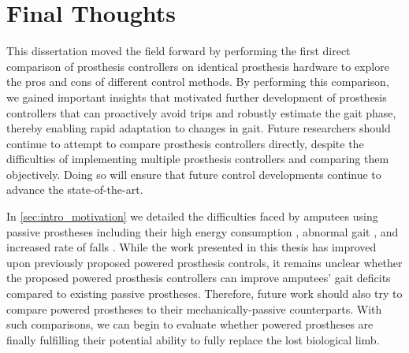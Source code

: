 \section{Final Thoughts}

This dissertation moved the field forward by performing the first direct
comparison of prosthesis controllers on identical prosthesis hardware to explore
the pros and cons of different control methods. By performing this comparison,
we gained important insights that motivated further development of prosthesis
controllers that can proactively avoid trips and robustly estimate the gait
phase, thereby enabling rapid adaptation to changes in gait. Future researchers
should continue to attempt to compare prosthesis controllers directly, despite
the difficulties of implementing multiple prosthesis controllers and comparing
them objectively. Doing so will ensure that future control developments
continue to advance the state-of-the-art. 

In \cref{sec:intro_motivation} we detailed the difficulties faced by amputees
using passive prostheses including their high energy consumption
\citep{waters1976energy}, abnormal gait \citep{jaegers1995prosthetic}, and
increased rate of falls \citep{miller2001prevalence}. While the work presented
in this thesis has improved upon previously proposed powered prosthesis
controls, it remains unclear whether the proposed powered prosthesis controllers
can improve amputees' gait deficits compared to existing passive prostheses.
Therefore, future work should also try to compare powered prostheses to their
mechanically-passive counterparts. With such comparisons, we can begin to
evaluate whether powered prostheses are finally fulfilling their potential
ability to fully replace the lost biological limb.
